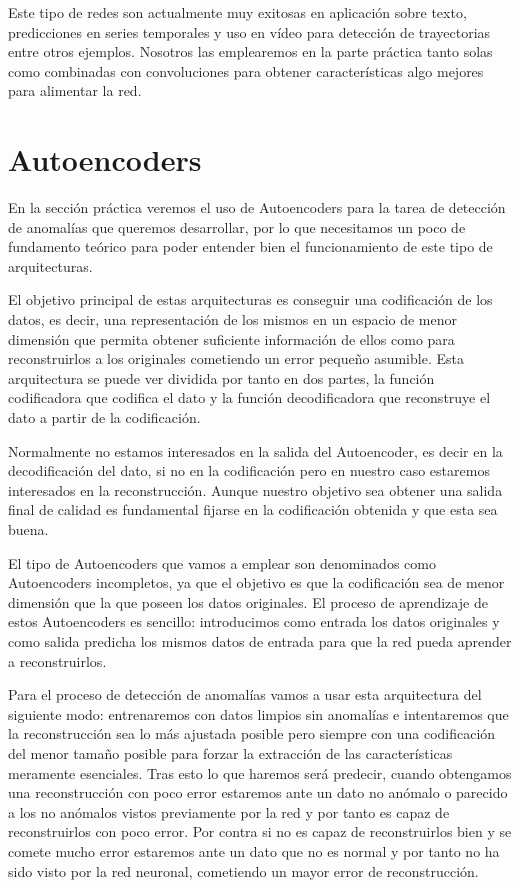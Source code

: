 Este tipo de redes son actualmente muy exitosas en aplicación sobre texto, predicciones en series temporales y uso en vídeo para detección de trayectorias entre otros ejemplos. Nosotros las emplearemos en la parte práctica tanto solas como combinadas con convoluciones para obtener características algo mejores para alimentar la red.

\section{Autoencoders}

En la sección práctica veremos el uso de Autoencoders para la tarea de detección de anomalías que queremos desarrollar, por lo que necesitamos un poco de fundamento teórico para poder entender bien el funcionamiento de este tipo de arquitecturas.

El objetivo principal de estas arquitecturas es conseguir una codificación de los datos, es decir, una representación de los mismos en un espacio de menor dimensión que permita obtener suficiente información de ellos como para reconstruirlos a los originales cometiendo un error pequeño asumible. Esta arquitectura se puede ver dividida por tanto en dos partes, la función codificadora que codifica el dato y la función decodificadora que reconstruye el dato a partir de la codificación.

Normalmente no estamos interesados en la salida del Autoencoder, es decir en la decodificación del dato, si no en la codificación pero en nuestro caso estaremos interesados en la reconstrucción. Aunque nuestro objetivo sea obtener una salida final de calidad es fundamental fijarse en la codificación obtenida y que esta sea buena.

El tipo de Autoencoders que vamos a emplear son denominados como Autoencoders incompletos, ya que el objetivo es que la codificación sea de menor dimensión que la que poseen los datos originales. El proceso de aprendizaje de estos Autoencoders es sencillo: introducimos como entrada los datos originales y como salida predicha los mismos datos de entrada para que la red pueda aprender a reconstruirlos.

Para el proceso de detección de anomalías vamos a usar esta arquitectura del siguiente modo: entrenaremos con datos limpios sin anomalías e intentaremos que la reconstrucción sea lo más ajustada posible pero siempre con una codificación del menor tamaño posible para forzar la extracción de las características meramente esenciales. Tras esto lo que haremos será predecir, cuando obtengamos una reconstrucción con poco error estaremos ante un dato no anómalo o parecido a los no anómalos vistos previamente por la red y por tanto es capaz de reconstruirlos con poco error. Por contra si no es capaz de reconstruirlos bien y se comete mucho error estaremos ante un dato que no es normal y por tanto no ha sido visto por la red neuronal, cometiendo un mayor error de reconstrucción.

